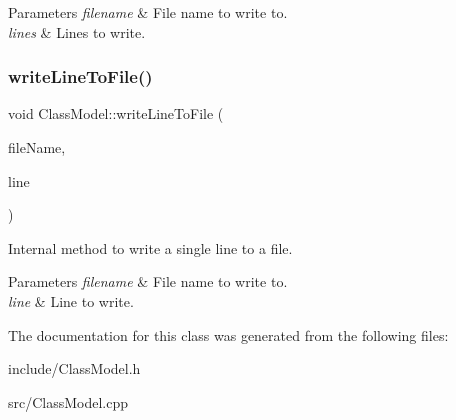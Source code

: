 \begin{DoxyParams}{Parameters}
{\em filename} & File name to write to. \\
\hline
{\em lines} & Lines to write. \\
\hline
\end{DoxyParams}
\mbox{\label{classClassModel_a4ef5baaf966305d2ebb44bf2c40ee533}} 
\subsubsection{\texorpdfstring{write\+Line\+To\+File()}{writeLineToFile()}}
{\footnotesize\ttfamily void Class\+Model\+::write\+Line\+To\+File (\begin{DoxyParamCaption}\item[{const Q\+String \&}]{file\+Name,  }\item[{const Q\+String \&}]{line }\end{DoxyParamCaption})\hspace{0.3cm}{\ttfamily [private]}}



Internal method to write a single line to a file. 


\begin{DoxyParams}{Parameters}
{\em filename} & File name to write to. \\
\hline
{\em line} & Line to write. \\
\hline
\end{DoxyParams}


The documentation for this class was generated from the following files\+:\begin{DoxyCompactItemize}
\item 
include/Class\+Model.\+h\item 
src/Class\+Model.\+cpp\end{DoxyCompactItemize}
